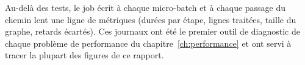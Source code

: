 Au-delà des tests, le job écrit à chaque micro-batch et à chaque passage du
chemin lent une ligne de métriques (durées par étape, lignes traitées, taille
du graphe, retards écartés). Ces journaux ont été le premier outil de
diagnostic de chaque problème de performance du chapitre~\ref{ch:performance}
et ont servi à tracer la plupart des figures de ce rapport.
